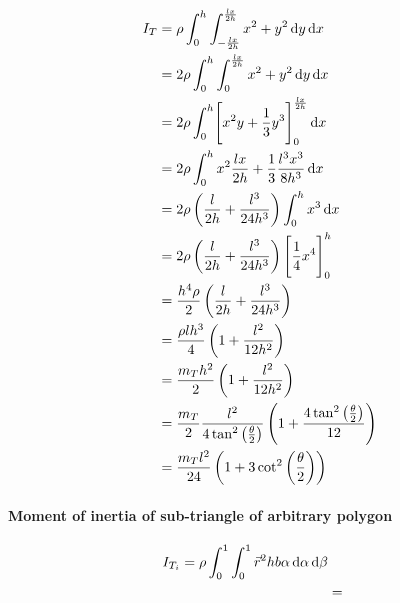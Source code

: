 \begin{equation}
	\label{eq:subtriangle_moment_long}
	\begin{split}
		I_{T} &= \rho \int_0^h\int_{-\frac{lx}{2h}}^{\frac{lx}{2h}}x^2 + y^2 \mathop{}\!\mathrm{d} y\mathop{}\!\mathrm{d} x\\
		&= 2\rho \int_0^h\int_0^{\frac{lx}{2h}} x^2 + y^2 \mathop{}\!\mathrm{d} y\mathop{}\!\mathrm{d} x\\
		&= 2\rho \int_0^h \Biggl[x^2y + \frac{1}{3} y^3\Biggr]_0^{\frac{lx}{2h}} \mathop{}\!\mathrm{d} x\\
		&= 2\rho \int_0^h x^2 \frac{lx}{2h} + \frac{1}{3} \frac{l^3x^3}{8h^3} \mathop{}\!\mathrm{d} x\\
		&= 2\rho \left(\frac{l}{2h} + \frac{l^3}{24h^3}\right) \int_0^h x^3 \mathop{}\!\mathrm{d} x\\
		&= 2\rho \left(\frac{l}{2h} + \frac{l^3}{24h^3}\right)  \Biggl[ \frac{1}{4} x^4\Biggr]_0^h \\
		&= \frac{h^4\rho}{2} \left(\frac{l}{2h} + \frac{l^3}{24h^3}\right) \\
		&= \frac{\rho lh^3}{4} \left(1 + \frac{l^2}{12h^2}\right) \\
		&= \frac{m_T h^2}{2} \left(1 + \frac{l^2}{12h^2}\right) \\
		&= \frac{m_T}{2} \frac{l^2}{4 \tan^2\left(\frac{\theta}{2}\right)}\left(1 + \frac{4 \tan^2\left(\frac{\theta}{2}\right)}{12}\right) \\
		&= \frac{m_Tl^2}{24} \left(1 + 3\cot^2\left(\frac{\theta}{2}\right)\right)
	\end{split}
\end{equation}

\newpage
\paragraph{Moment of inertia of sub-triangle of arbitrary polygon}
\begin{equation}
	\label{eq:subtriangle_arbitrary_moment_long}
	\begin{split}
		I_{T_i} = \rho \int_0^1 \int_0^1 \vec r^2 hb \alpha  \mathop{}\!\mathrm{d} \alpha \mathop{}\!\mathrm{d} \beta\\
		&=
	\end{split}
\end{equation}
